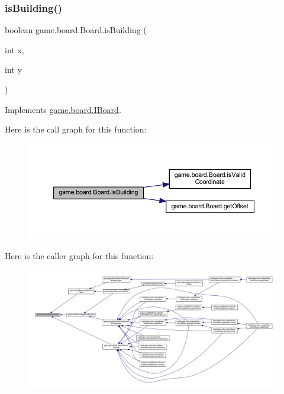 \subsubsection{\texorpdfstring{is\+Building()}{isBuilding()}}
{\footnotesize\ttfamily boolean game.\+board.\+Board.\+is\+Building (\begin{DoxyParamCaption}\item[{int}]{x,  }\item[{int}]{y }\end{DoxyParamCaption})\hspace{0.3cm}{\ttfamily [inline]}}



Implements \mbox{\hyperlink{interfacegame_1_1board_1_1_i_board_aa493421a953d10fc9eaf45fa74f0a64d}{game.\+board.\+I\+Board}}.

Here is the call graph for this function\+:
\nopagebreak
\begin{figure}[H]
\begin{center}
\leavevmode
\includegraphics[width=350pt]{classgame_1_1board_1_1_board_a6b6e3fb41b451a50ef9d5135067c2582_cgraph}
\end{center}
\end{figure}
Here is the caller graph for this function\+:
\nopagebreak
\begin{figure}[H]
\begin{center}
\leavevmode
\includegraphics[width=350pt]{classgame_1_1board_1_1_board_a6b6e3fb41b451a50ef9d5135067c2582_icgraph}
\end{center}
\end{figure}
\mbox{\label{classgame_1_1board_1_1_board_aed2c46e80ddb40b36cbd09bb42b43974}} 
